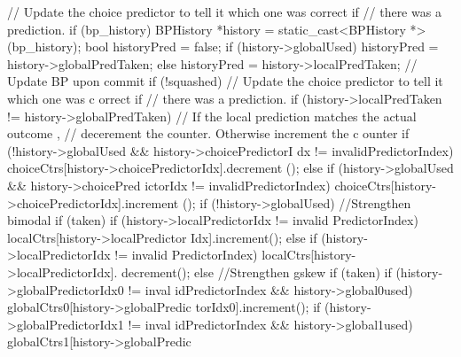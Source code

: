 \begin{DoxyCode}
{
    // Update the choice predictor to tell it which one was correct if
    // there was a prediction.
    if (bp_history) {
        BPHistory *history = static_cast<BPHistory *>(bp_history);
        bool historyPred = false;
        if (history->globalUsed) {
           historyPred = history->globalPredTaken;
        } else {
           historyPred = history->localPredTaken;
        }
                // Update BP upon commit
                if (!squashed) {
                        // Update the choice predictor to tell it which one was c
      orrect if
                        // there was a prediction.
                        if (history->localPredTaken != history->globalPredTaken) 
      {
                            // If the local prediction matches the actual outcome
      ,
                            // decerement the counter.  Otherwise increment the c
      ounter
                            if (!history->globalUsed && history->choicePredictorI
      dx != invalidPredictorIndex) {
                                choiceCtrs[history->choicePredictorIdx].decrement
      ();
                            } else if (history->globalUsed && history->choicePred
      ictorIdx != invalidPredictorIndex) {
                                choiceCtrs[history->choicePredictorIdx].increment
      ();
                            }
                        }
                        if (!history->globalUsed) {
                           //Strengthen bimodal
                                if (taken) {
                                        if (history->localPredictorIdx != invalid
      PredictorIndex)
                                                localCtrs[history->localPredictor
      Idx].increment();
                                } else {
                                        if (history->localPredictorIdx != invalid
      PredictorIndex)
                                           localCtrs[history->localPredictorIdx].
      decrement();
                                }
                        } else {
                           //Strengthen gskew
                                if (taken) {
                                        if (history->globalPredictorIdx0 != inval
      idPredictorIndex && history->global0used)
                                                globalCtrs0[history->globalPredic
      torIdx0].increment();
                                        if (history->globalPredictorIdx1 != inval
      idPredictorIndex && history->global1used)
                                                globalCtrs1[history->globalPredic
}}}}}
\end{DoxyCode}
